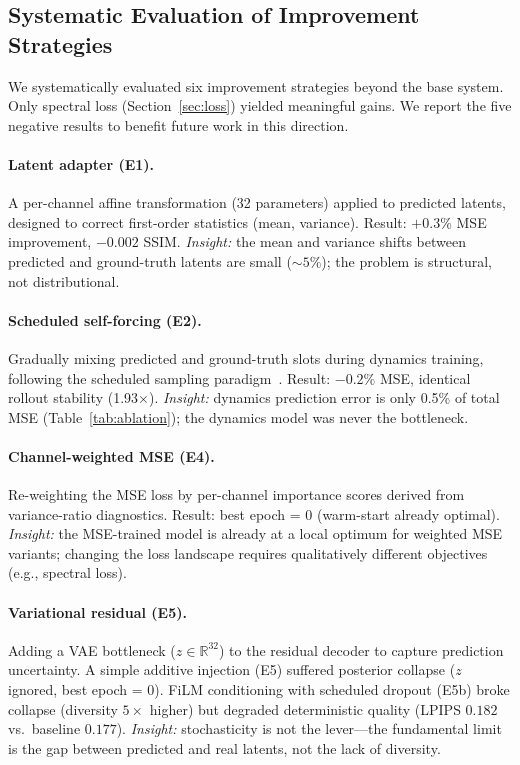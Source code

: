 \documentclass{article}
\begin{document}
\subsection{Systematic Evaluation of Improvement Strategies}
\label{sec:negative}

We systematically evaluated six improvement strategies beyond the base
system.
Only spectral loss (Section~\ref{sec:loss}) yielded meaningful gains.
We report the five negative results to benefit future work in this
direction.

\paragraph{Latent adapter (E1).}
A per-channel affine transformation (32 parameters) applied to predicted
latents, designed to correct first-order statistics (mean, variance).
Result: $+0.3\%$ MSE improvement, $-0.002$ SSIM.
\textit{Insight:} the mean and variance shifts between predicted and
ground-truth latents are small (${\sim}5\%$); the problem is structural,
not distributional.

\paragraph{Scheduled self-forcing (E2).}
Gradually mixing predicted and ground-truth slots during dynamics
training, following the scheduled sampling
paradigm~\cite{bengio2015scheduled}.
Result: $-0.2\%$ MSE, identical rollout stability (1.93$\times$).
\textit{Insight:} dynamics prediction error is only 0.5\% of total MSE
(Table~\ref{tab:ablation}); the dynamics model was never the bottleneck.

\paragraph{Channel-weighted MSE (E4).}
Re-weighting the MSE loss by per-channel importance scores derived from
variance-ratio diagnostics.
Result: best epoch = 0 (warm-start already optimal).
\textit{Insight:} the MSE-trained model is already at a local optimum
for weighted MSE variants; changing the loss landscape requires
qualitatively different objectives (e.g., spectral loss).

\paragraph{Variational residual (E5).}
Adding a VAE bottleneck ($z \in \mathbb{R}^{32}$) to the residual
decoder to capture prediction uncertainty.
A simple additive injection (E5) suffered posterior collapse
($z$ ignored, best epoch = 0).
FiLM conditioning with scheduled dropout (E5b) broke collapse
(diversity $5\times$ higher) but degraded deterministic quality
(LPIPS $0.182$ vs.\ baseline $0.177$).
\textit{Insight:} stochasticity is not the lever---the fundamental
limit is the gap between predicted and real latents, not the lack of
diversity.
\end{document}
